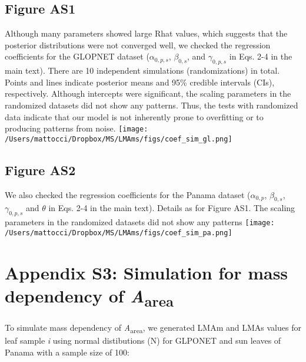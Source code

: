 \documentclass[
  12pt,
  letterpaper,
  DIV=11,
  numbers=noendperiod]{scrartcl}
\begin{document}
\newpage

\hypertarget{figure-as1}{%
\subsection{Figure AS1}\label{figure-as1}}

Although many parameters showed large Rhat values, which suggests that
the posterior distributions were not converged well, we checked the
regression coefficients for the GLOPNET dataset (\(\alpha_{0, p, s}\),
\(\beta_{0, s}\), and \(\gamma_{0, p, s}\) in Eqs. 2-4 in the main
text). There are 10 independent simulations (randomizations) in total.
Points and lines indicate posterior means and 95\% credible intervals
(CIs), respectively. Although intercepts were significant, the scaling
parameters in the randomized datasets did not show any patterns. Thus,
the tests with randomized data indicate that our model is not inherently
prone to overfitting or to producing patterns from noise.
\texttt{[image: /Users/mattocci/Dropbox/MS/LMAms/figs/coef\_sim\_gl.png]}

\newpage

\hypertarget{figure-as2}{%
\subsection{Figure AS2}\label{figure-as2}}

We also checked the regression coefficients for the Panama dataset
(\(\alpha_{0, p}\), \(\beta_{0, s}\), \(\gamma_{0, p, s}\) and
\(\theta\) in Eqs. 2-4 in the main text). Details as for Figure AS1. The
scaling parameters in the randomized datasets did not show any patterns
\texttt{[image: /Users/mattocci/Dropbox/MS/LMAms/figs/coef\_sim\_pa.png]}

\newpage

\hypertarget{appendix-s3-simulation-for-mass-dependency-of-aarea}{%
\section{\texorpdfstring{Appendix S3: Simulation for mass dependency of
\emph{A}\textsubscript{area}}{Appendix S3: Simulation for mass dependency of Aarea}}\label{appendix-s3-simulation-for-mass-dependency-of-aarea}}

To simulate mass dependency of \emph{A}\textsubscript{area}, we
generated LMAm and LMAs values for leaf sample \emph{i} using normal
distibutions (N) for GLPONET and sun leaves of Panama with a sample size
of 100:
\end{document}

